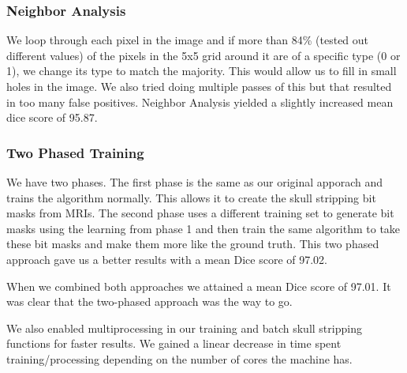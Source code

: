 \documentclass[letterpaper, 10 pt, conference]{ieeeconf}
\begin{document}
\subsubsection{Neighbor Analysis}
We loop through each pixel in the image and if more than 84\% (tested out different values) of the pixels in the 5x5 grid around it are of a specific type (0 or 1), we change its type to match the majority. This would allow us to fill in small holes in the image. We also tried doing  multiple passes of this but that resulted in too many false positives. Neighbor Analysis yielded a slightly increased mean dice score of 95.87.
\subsubsection{Two Phased Training}
We have two phases. The first phase is the same as our original apporach and trains the algorithm normally. This allows it to create the skull stripping bit masks from MRIs. The second phase uses a different training set to generate bit masks using the learning from phase 1 and then train the same algorithm to take these bit masks and make them more like the ground truth. This two phased approach gave us a better results with a mean Dice score of 97.02.

When we combined both approaches we attained a mean Dice score of 97.01. It was clear that the two-phased approach was the way to go.

We also enabled multiprocessing in our training and batch skull stripping functions for faster results. We gained a linear decrease in time spent training/processing depending on the number of cores the machine has.
\end{document}
